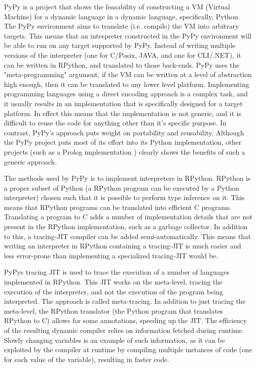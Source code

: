 PyPy is a project that shows the feasability of constructing a VM (Virtual Machine) 
for a dynamic  language in a dynamic language, specifically, Python. The PyPy 
environment aims to translate (i.e. compile) the VM into arbitrary targets. This 
means that an interpreter constructed in the PyPy environment will be able to 
run on any target supported by PyPy. Instead of writing multiple versions of 
the interpreter (one for C/Posix, JAVA, and one for CLI/.NET), it can be 
written in RPython, and translated to those back-ends. PyPy uses the 
"meta-programming" argument, if the VM can be written at a level of abstraction 
high enough, then it can be translated to any lower level platform. Implementing 
programming languages using a direct encoding approach is a complex task, and it 
usually results in an implementation that is specifically designed for a target platform. 
In effect this means that the implementation is not generic, and it is difficult to 
reuse the code for anything other than it's specific purpose. In contrast, 
PyPy's approach puts weight on portability and reusability\cite{pypy}. Although the
PyPy project puts most of its effort into its Python implementation, other projects
(such as a Prolog implementation \cite{bolz2010towards}) clearly shows the benefits of
such a generic approach.

The methods used by PyPy is to implement interpreters in RPython. RPython is a proper 
subset of Python (a RPython program can be executed by a Python interpreter) 
chosen such that it is possible to perform type inference on it. This
means that RPython programs can be translated into efficient C programs. Translating a 
program to C adds a number of implementation details that are not present in the RPython
implementation, such as a garbage collector. In addition to this, a tracing-JIT compiler 
can be added semi-automatically. This means that writing an interpreter in RPython containing
a tracing-JIT is much easier and less error-prone than implementing a specialized tracing-JIT
would be. 
\cite{bolz2011runtime}

PyPys tracing JIT is used to trace the execution of a number of languages implemented 
in RPython.
This JIT works on the meta-level, tracing the execution of the interpreter, and not the 
execution of the program being interpreted. The approach is called meta-tracing. In addition
to just tracing the meta-level, the RPython translator (the Python program that translates
RPython to C) allows for some annotations, speeding up the JIT. The efficiency of the 
resulting dynamic compiler relies on information fetched during runtime. Slowly changing 
variables is an example of such information, as it can be exploited by the compiler at 
runtime by compiling multiple instances of code (one for each value of the variable),
resulting in faster code. \cite{bolz2011runtime}


